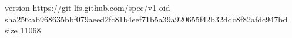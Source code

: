 version https://git-lfs.github.com/spec/v1
oid sha256:ab968635bbf079aeed2fc81b4eef71b5a39a920655f42b32ddc8f82afdc947bd
size 11068
